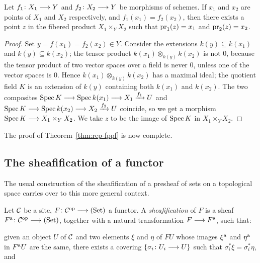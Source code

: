 \begin{2   CONTRAVARIANT FUNCTORS}
\begin{2.3 Sheaves in Grothendieck topologies}
\begin{lemma}\label{lem:product-set}
Let $f_1 \colon X_1 \arr Y$ and $f_2 \colon X_2 \arr Y$ be morphisms of schemes. If $x_1$ and $x_2$ are points  of $X_1$ and $X_2$ respectively, and $f_1(x_1) = f_2(x_2)$, then there exists a point $z$ in the fibered product $X_1 \times_{Y} X_2$ such that $\operatorname{pr}_1(z) = x_1$ and $\operatorname{pr}_2(z) = x_2$.
\end{lemma}

\begin{proof}

Set $y = f(x_1) = f_2(x_2) \in Y$. Consider the extensions $k(y) \subseteq k(x_1)$ and $k(y) \subseteq k(x_2)$; the tensor product $k(x_1) \otimes_{k(y)} k(x_2)$ is not 0, because the tensor product of two vector spaces over a field is never $0$, unless one of the vector spaces is $0$. Hence $k(x_1) \otimes_{k(y)} k(x_2)$ has a maximal ideal; the quotient field $K$ is an extension of $k(y)$ containing both $k(x_1)$ and $k(x_2)$. The two composites $\spec K \arr \spec k(x_1) \arr X_1 \xrightarrow{f_1} U$ and $\spec K \arr \spec k(x_2)\arr X_2 \xrightarrow{f_2} U$ coincide, so we get a morphism $\spec K \arr X_{1} \times_Y X_{2}$. We take $z$ to be the image of $\operatorname{Spec} K$ in $X_1 \times_{Y} X_2$.
\end{proof}

The proof of Theorem~\ref{thm:rep-fppf} is now complete.



\subsection{The sheafification of a functor}

The usual construction of the sheafification of a presheaf of sets on a topological space carries over to this more general context.

\begin{definition}\label{def:sheafification}
Let $\mathcal{C}$ be a site, $F \colon \cC\op \arr \catset$ a functor. A \emph{sheafification} of $F$ is a sheaf $F\ass \colon \cC\op \arr \catset$, together with a natural transformation $F \arr F\ass$, such that:

\begin{enumeratei}

\item given an object $U$ of $\mathcal{C}$ and two elements $\xi$ and $\eta$ of $FU$ whose images $\xi^\mathrm{a}$ and $\eta^\mathrm{a}$ in  $F^\mathrm{a} U$ are the same, there exists a covering $\{\sigma_i\colon U_i \arr U\}$ such that $\sigma_i^* \xi = \sigma_i^* \eta$, and


\end{enumeratei}
\end{definition}
\end{2.3 Sheaves in Grothendieck topologies}
\end{2   CONTRAVARIANT FUNCTORS}
